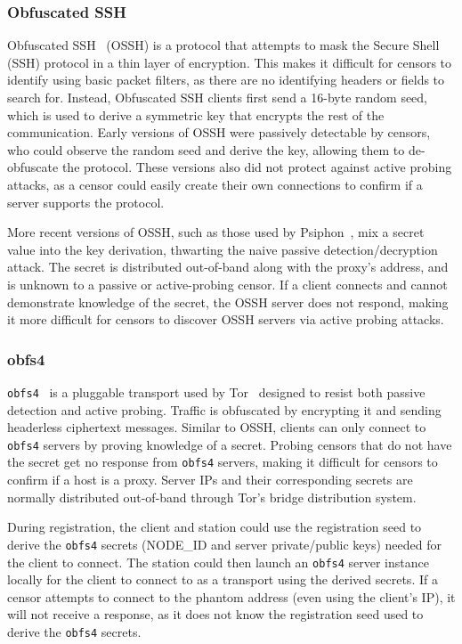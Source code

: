 \documentclass[sigconf,anonymous]{acmart}
\newcommand{\TODO}[1]{\hl{TODO: #1}\xspace}
\begin{document}
\subsubsection{Obfuscated SSH}
\label{sec:ossh}

Obfuscated SSH~\cite{ossh} (OSSH) is a protocol that attempts to mask the Secure Shell
(SSH) protocol in a thin
layer of encryption. This makes it difficult for censors to identify using basic
packet filters, as there are no identifying headers or fields
to search for. Instead, Obfuscated SSH clients first send a 16-byte random seed, which
is used to derive a symmetric key that encrypts the rest of the
communication. Early versions of OSSH were passively detectable by censors, who
could observe the random seed and derive the key, allowing them to de-obfuscate the protocol.
These versions also did
not protect against active probing attacks, as a censor could easily create their
own connections to confirm if a server supports the protocol.

More recent versions of OSSH, such as those used by Psiphon~\cite{psiphon}, mix a secret
value into the key derivation, thwarting the naive passive detection/decryption
attack. The secret is distributed out-of-band along with the proxy's address,
and is unknown to a passive or active-probing censor. If a client connects and cannot
demonstrate knowledge of
the secret, the OSSH server does not respond, making it more difficult for
censors to discover OSSH servers via active probing attacks.


\subsubsection{obfs4}

\texttt{obfs4}~\cite{obfs4} is a pluggable transport used by
Tor~\cite{tor} designed to resist both passive detection and active probing.
Traffic is obfuscated by encrypting it and sending headerless ciphertext
messages. Similar to OSSH, clients can only connect to \texttt{obfs4}
servers by proving knowledge of a secret. Probing censors that do not have the
secret get no response from \texttt{obfs4} servers, making it difficult for
censors to confirm if a host is a proxy. Server IPs and their corresponding secrets
are normally distributed out-of-band through Tor's bridge distribution system.

During registration, the \scheme client and station could use the registration seed to
derive the \texttt{obfs4} secrets (NODE\_ID and server private/public keys)
needed for the client to connect. The station could then launch an \texttt{obfs4} server
instance locally for the client to connect to as a transport using the
derived secrets. If a censor attempts to connect to the phantom address (even
using the client's IP), it will not receive a response, as it does not know the
registration seed used to derive the \texttt{obfs4} secrets.
\end{document}
